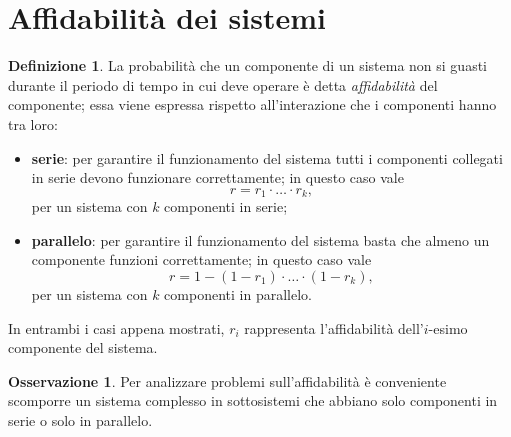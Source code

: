 \documentclass[12pt,openany]{amsbook}
\theoremstyle{plain}
\numberwithin{equation}{section} %
\theoremstyle{definition}
\newtheorem{defn}[thm]{Definizione}
\newtheorem{obsv}[thm]{Osservazione}
\newcommand\nbdash{\nobreakdash-\hspace{0pt}}
\begin{document}
        \section{Affidabilità dei sistemi}
            \begin{defn}
                La probabilità che un componente di un sistema non si guasti durante il periodo di tempo in cui deve operare è detta \textit{affidabilità} del componente; essa viene espressa rispetto all'interazione che i componenti hanno tra loro:
                \begin{itemize}
                    \item \textbf{serie}: per garantire il funzionamento del sistema tutti i componenti collegati in serie devono funzionare correttamente; in questo caso vale \[
                        r = r_1 \cdot \ldots \cdot r_k
                    ,\] per un sistema con $k$ componenti in serie;
                \item \textbf{parallelo}: per garantire il funzionamento del sistema basta che almeno un componente funzioni correttamente; in questo caso vale \[
                            r = 1 - (1 - r_1) \cdot \ldots \cdot (1 - r_k)
                    ,\] per un sistema con $k$ componenti in parallelo.
                \end{itemize}
                In entrambi i casi appena mostrati, $r_i$ rappresenta l'affidabilità dell'$i$\nbdash esimo componente del sistema.
            \end{defn}
            \begin{obsv}
                Per analizzare problemi sull'affidabilità è conveniente scomporre un sistema complesso in sottosistemi che abbiano solo componenti in serie o solo in parallelo.
            \end{obsv}
\end{document}
